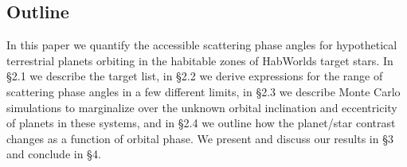 \documentclass[
    usenatbib,
]{mnras}
\begin{document}
\subsection{Outline}
In this paper we quantify the accessible scattering phase angles for hypothetical terrestrial planets orbiting in the habitable zones of HabWorlds target stars. In \S 2.1 we describe the target list, in \S 2.2 we derive expressions for the range of scattering phase angles in a few different limits, in \S 2.3 we describe Monte Carlo simulations to marginalize over the unknown orbital inclination and eccentricity of planets in these systems, and in \S 2.4 we outline how the planet/star contrast changes as a function of orbital phase.  We present and discuss our results in \S 3 and conclude in \S 4.  %






 
\end{document}
